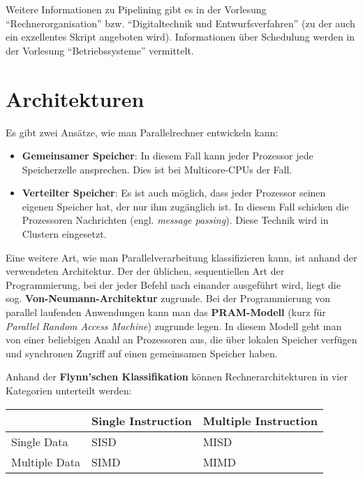 Weitere Informationen zu Pipelining gibt es in der Vorlesung \enquote{Rechnerorganisation}
bzw. \enquote{Digitaltechnik und Entwurfsverfahren} (zu der auch ein exzellentes Skript angeboten wird). Informationen über Schedulung werden in der Vorlesung \enquote{Betriebssysteme}
vermittelt.

\section{Architekturen}
Es gibt zwei Ansätze, wie man Parallelrechner entwickeln kann:
\begin{itemize}
    \item \textbf{Gemeinsamer Speicher}: In diesem Fall kann jeder Prozessor 
          jede Speicherzelle ansprechen. Dies ist bei Multicore-CPUs der Fall.
    \item \textbf{Verteilter Speicher}: Es ist auch möglich, dass jeder Prozessor
          seinen eigenen Speicher hat, der nur ihm zugänglich ist. In diesem Fall
          schicken die Prozessoren Nachrichten (engl. \textit{message passing}). Diese Technik wird in Clustern eingesetzt.
\end{itemize}

Eine weitere Art, wie man Parallelverarbeitung klassifizieren kann, ist anhand 
der verwendeten Architektur. Der der üblichen, sequentiellen Art der Programmierung,
bei der jeder Befehl nach einander ausgeführt wird, liegt die sog.
\textbf{Von-Neumann-Architektur} zugrunde.
Bei der Programmierung von parallel laufenden Anwendungen kann man das \textbf{PRAM-Modell} (kurz für \textit{Parallel Random Access Machine}) zugrunde legen.
In diesem Modell geht man von einer beliebigen Anahl an Prozessoren aus, die
über lokalen Speicher verfügen und synchronen Zugriff auf einen gemeinsamen
Speicher haben.

Anhand der \textbf{Flynn'schen Klassifikation}
können Rechnerarchitekturen in vier Kategorien unterteilt werden:

\begin{table}[h]
    \centering
    \begin{tabular}{l|ll}
    ~              & Single Instruction  & Multiple Instruction \\ \hline
    Single Data    & SISD                & MISD                  \\
    Multiple Data  & SIMD                & MIMD                  \\
    \end{tabular}
\end{table}

